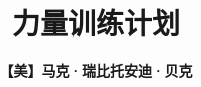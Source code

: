 \documentclass[a4paper, 12pt, openright]{ctexbook}
\begin{document}
\frontmatter

\title{\Huge \textbf{力量训练计划}}
\author{\textbf{【美】马克·瑞比托\quad 安迪·贝克}}
\date{}

\maketitle

\tableofcontents

\mainmatter



\end{document}
